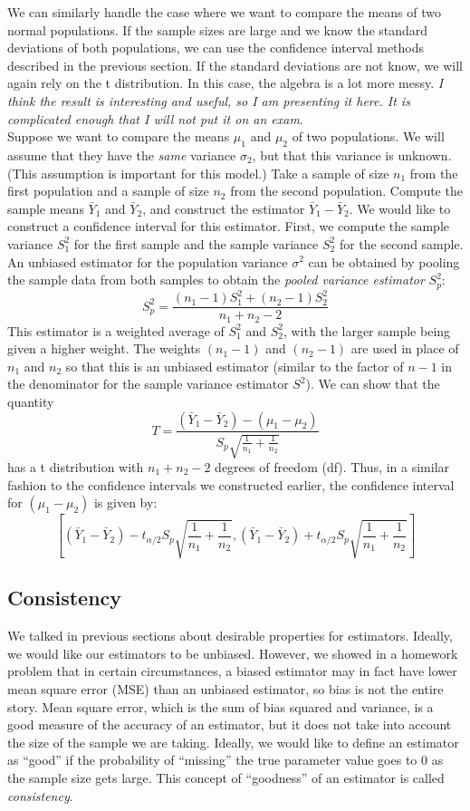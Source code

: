 \documentclass[12pt]{article}
\theoremstyle{definition}
\theoremstyle{remark}
\begin{document}
We can similarly handle the case where we want to compare the means of two normal populations. If the sample sizes are large and we know the standard deviations of both populations, we can use the confidence interval methods described in the previous section. If the standard deviations are not know, we will again rely on the t distribution. In this case, the algebra is a lot more messy. \emph{I think the result is interesting and useful, so I am presenting it here. It is complicated enough that I will not put it on an exam}.\\

Suppose we want to compare the means $\mu_1$ and $\mu_2$ of two populations. We will assume that they have the \emph{same} variance $\sigma_2$, but that this variance is unknown. (This assumption is important for this model.) Take a sample of size $n_1$ from the first population and a sample of size $n_2$ from the second population. Compute the sample means $\bar{Y}_1$ and $\bar{Y}_2$, and construct the estimator $\bar{Y}_1 - \bar{Y}_2$. We would like to construct a confidence interval for this estimator.
First, we compute the sample variance $S^2_1$ for the first sample and the sample variance $S^2_2$ for the second sample. An unbiased estimator for the population variance $\sigma^2$ can be obtained by pooling the sample data from both samples to obtain the \emph{pooled variance estimator} $S^2_p$:
\[
S^2_p = \frac{(n_1 - 1)S^2_1 + (n_2 - 1)S^2_2}{n_1 + n_2 - 2}
\]
This estimator is a weighted average of $S^2_1$ and $S^2_2$, with the larger sample being given a higher weight. The weights $(n_1 - 1)$ and $(n_2 - 1)$ are used in place of $n_1$ and $n_2$ so that this is an unbiased estimator (similar to the factor of $n-1$ in the denominator for the sample variance estimator $S^2$). We can show that the quantity
\[
T = \dfrac{ (\bar{Y}_1 - \bar{Y}_2) - (\mu_1 - \mu_2) }{S_p \sqrt{ \frac{1}{n_1} + \frac{1}{n_2} }}
\]
has a t distribution with $n_1 + n_2 - 2$ degrees of freedom (df). Thus, in a similar fashion to the confidence intervals we constructed earlier, the confidence interval for $(\mu_1 - \mu_2)$ is given by:
\[
\left[ (\bar{Y}_1 - \bar{Y}_2) - t_{\alpha/2} S_p \sqrt{ \frac{1}{n_1} + \frac{1}{n_2} }, (\bar{Y}_1 - \bar{Y}_2) + t_{\alpha/2} S_p \sqrt{ \frac{1}{n_1} + \frac{1}{n_2} }\right]
\]

\subsection{Consistency}
We talked in previous sections about desirable properties for estimators. Ideally, we would like our estimators to be unbiased. However, we showed in a homework problem that in certain circumstances, a biased estimator may in fact have lower mean square error (MSE) than an unbiased estimator, so bias is not the entire story. Mean square error, which is the sum of bias squared and variance, is a good measure of the accuracy of an estimator, but it does not take into account the size of the sample we are taking. Ideally, we would like to define an estimator as ``good'' if the probability of ``missing'' the true parameter value goes to 0 as the sample size gets large. This concept of ``goodness'' of an estimator is called \emph{consistency}.\\
\end{document}

